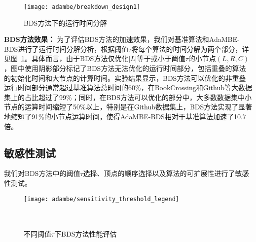 \begin{figure} [t]
	\centering
	\texttt{[image: adambe/breakdown\_design1]}
	\caption{BDS方法下的运行时间分解}

	\label{fig:ada_breakdown_design1}
\end{figure}


\textbf{BDS方法效果：} 为了评估BDS方法的加速效果，我们对基准算法和AdaMBE-BDS进行了运行时间分解分析，根据阈值$\tau$将每个算法的时间分解为两个部分，详见图~\ref{fig:ada_breakdown_design1}。具体而言，由于BDS方法仅优化$|L|$等于或小于阈值$\tau$的小节点$(L, R, C)$，图中使用阴影部分标记了BDS方法无法优化的运行时间部分，包括重叠的算法的初始化时间和大节点的计算时间。实验结果显示，BDS方法可以优化的非重叠运行时间部分通常超过基准算法总时间的60\%，在BookCrossing和Github等大数据集上的占比超过了99\%；同时，在BDS方法可以优化的部分中，大多数数据集中小节点的运算时间缩短了50\%以上，特别是在Github数据集上，BDS方法实现了显著地缩短了91\%的小节点运算时间，使得AdaMBE-BDS相对于基准算法加速了10.7倍。




\subsection{敏感性测试}
\label{subsec:ada_eval_sensitivity}

我们对BDS方法中的阈值$\tau$选择、顶点的顺序选择以及算法的可扩展性进行了敏感性测试。

\begin{figure} [H]
	\centering
  \texttt{[image: adambe/sensitivity\_threshold\_legend]} \\
	
	\\
	\\

	\caption{不同阈值$\tau$下BDS方法性能评估}
	\label{fig:ada_sensitivity_threshold}

\end{figure}



